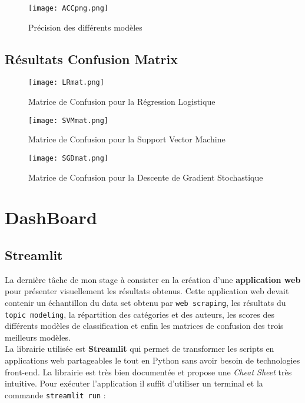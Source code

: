 \documentclass[a4paper,french,12pt]{article}
\begin{document}
\noindent

\begin{figure}[!h]
    \centering
    \texttt{[image: ACCpng.png]}
    \caption{Précision des différents modèles}
\end{figure}

\clearpage

\subsection{Résultats Confusion Matrix}

\vspace{25mm}

\begin{figure}[!h]
    \centering
    \texttt{[image: LRmat.png]}
    \caption{Matrice de Confusion pour la Régression Logistique}
\end{figure}

\begin{figure}[!h]
    \centering
    \texttt{[image: SVMmat.png]}
    \caption{Matrice de Confusion pour la Support Vector Machine}
\end{figure}

\begin{figure}[!h]
    \centering
    \texttt{[image: SGDmat.png]}
    \caption{Matrice de Confusion pour la Descente de Gradient Stochastique}
\end{figure}

\clearpage

\section{DashBoard}
\label{sec:DashBoard}

\subsection{Streamlit}

La dernière tâche de mon stage à consister en la création d'une \textbf{application web} pour présenter visuellement les résultats obtenus. Cette application web devait contenir un échantillon du data set obtenu par \verb|web scraping|, les résultats du \verb|topic modeling|, la répartition des catégories et des auteurs, les scores des différents modèles de classification et enfin les matrices de confusion des trois meilleurs modèles.\\

La librairie utilisée est \textbf{Streamlit} qui permet de transformer les scripts en applications web partageables le tout en Python sans avoir besoin de technologies front-end. La librairie est très bien documentée et propose une \emph{Cheat Sheet} très intuitive. Pour exécuter l'application il suffit d'utiliser un terminal et la commande \verb|streamlit run| :
\end{document}
